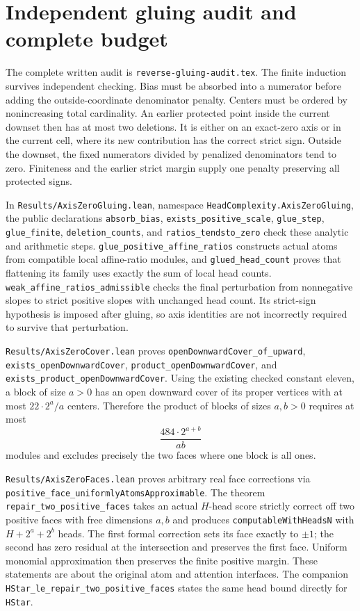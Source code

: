 \documentclass[11pt]{article}
\begin{document}
\section{Independent gluing audit and complete budget}
The complete written audit is \texttt{reverse-gluing-audit.tex}.
The finite induction survives independent checking. Bias must be absorbed
into a numerator before adding the outside-coordinate denominator penalty.
Centers must be ordered by nonincreasing total cardinality. An earlier
protected point inside the current downset then has at most two deletions.
It is either on an exact-zero axis or in the current cell, where its new
contribution has the correct strict sign. Outside the downset, the fixed
numerators divided by penalized denominators tend to zero. Finiteness and
the earlier strict margin supply one penalty preserving all protected signs.

In \texttt{Results/AxisZeroGluing.lean}, namespace
\texttt{HeadComplexity.AxisZeroGluing}, the public declarations
\texttt{absorb\_bias}, \texttt{exists\_positive\_scale},
\texttt{glue\_step}, \texttt{glue\_finite},
\texttt{deletion\_counts}, and \texttt{ratios\_tendsto\_zero}
check these analytic and arithmetic steps.
\texttt{glue\_positive\_affine\_ratios} constructs actual atoms from
compatible local affine-ratio modules, and \texttt{glued\_head\_count}
proves that flattening its family uses exactly the sum of local head counts.
\texttt{weak\_affine\_ratios\_admissible} checks the final perturbation
from nonnegative slopes to strict positive slopes with unchanged head count.
Its strict-sign hypothesis is imposed after gluing, so axis identities
are not incorrectly required to survive that perturbation.

\texttt{Results/AxisZeroCover.lean} proves
\texttt{openDownwardCover\_of\_upward},
\texttt{exists\_openDownwardCover},
\texttt{product\_openDownwardCover}, and
\texttt{exists\_product\_openDownwardCover}.
Using the existing checked constant eleven, a block of size $a>0$ has an
open downward cover of its proper vertices with at most $22\cdot2^a/a$
centers. Therefore the product of blocks of sizes $a,b>0$ requires at most
\[
 \frac{484\cdot2^{a+b}}{ab}
\]
modules and excludes precisely the two faces where one block is all ones.

\texttt{Results/AxisZeroFaces.lean} proves arbitrary real face corrections
via \texttt{positive\_face\_uniformlyAtomsApproximable}.
The theorem \texttt{repair\_two\_positive\_faces} takes an actual $H$-head
score strictly correct off two positive faces with free dimensions $a,b$
and produces \texttt{computableWithHeadsN} with $H+2^a+2^b$ heads.
The first formal correction sets its face exactly to $\pm1$; the second
has zero residual at the intersection and preserves the first face.
Uniform monomial approximation then preserves the finite positive margin.
These statements are about the original atom and attention interfaces.
The companion \texttt{HStar\_le\_repair\_two\_positive\_faces}
states the same head bound directly for \texttt{HStar}.
\end{document}
